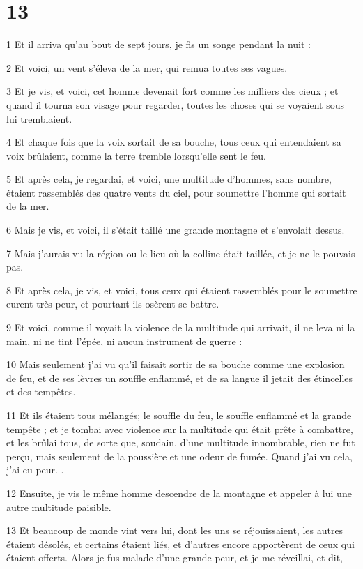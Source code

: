\chapter{13}

\par 1 Et il arriva qu'au bout de sept jours, je fis un songe pendant la nuit :
\par 2 Et voici, un vent s'éleva de la mer, qui remua toutes ses vagues.
\par 3 Et je vis, et voici, cet homme devenait fort comme les milliers des cieux ; et quand il tourna son visage pour regarder, toutes les choses qui se voyaient sous lui tremblaient.
\par 4 Et chaque fois que la voix sortait de sa bouche, tous ceux qui entendaient sa voix brûlaient, comme la terre tremble lorsqu'elle sent le feu.
\par 5 Et après cela, je regardai, et voici, une multitude d'hommes, sans nombre, étaient rassemblés des quatre vents du ciel, pour soumettre l'homme qui sortait de la mer.
\par 6 Mais je vis, et voici, il s'était taillé une grande montagne et s'envolait dessus.
\par 7 Mais j'aurais vu la région ou le lieu où la colline était taillée, et je ne le pouvais pas.
\par 8 Et après cela, je vis, et voici, tous ceux qui étaient rassemblés pour le soumettre eurent très peur, et pourtant ils osèrent se battre.
\par 9 Et voici, comme il voyait la violence de la multitude qui arrivait, il ne leva ni la main, ni ne tint l'épée, ni aucun instrument de guerre :
\par 10 Mais seulement j'ai vu qu'il faisait sortir de sa bouche comme une explosion de feu, et de ses lèvres un souffle enflammé, et de sa langue il jetait des étincelles et des tempêtes.
\par 11 Et ils étaient tous mélangés; le souffle du feu, le souffle enflammé et la grande tempête ; et je tombai avec violence sur la multitude qui était prête à combattre, et les brûlai tous, de sorte que, soudain, d'une multitude innombrable, rien ne fut perçu, mais seulement de la poussière et une odeur de fumée. Quand j'ai vu cela, j'ai eu peur. .
\par 12 Ensuite, je vis le même homme descendre de la montagne et appeler à lui une autre multitude paisible.
\par 13 Et beaucoup de monde vint vers lui, dont les uns se réjouissaient, les autres étaient désolés, et certains étaient liés, et d'autres encore apportèrent de ceux qui étaient offerts. Alors je fus malade d'une grande peur, et je me réveillai, et dit,

